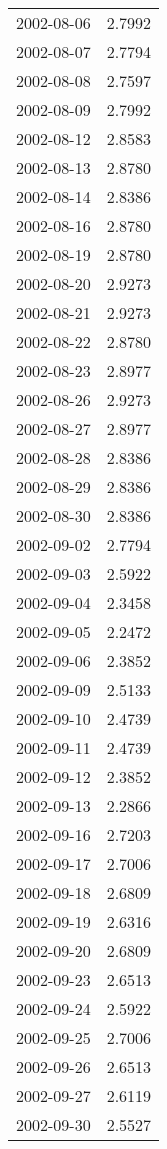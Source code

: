 \begin{tabular}{lr}
2002-08-06 &      2.7992 \\
2002-08-07 &      2.7794 \\
2002-08-08 &      2.7597 \\
2002-08-09 &      2.7992 \\
2002-08-12 &      2.8583 \\
2002-08-13 &      2.8780 \\
2002-08-14 &      2.8386 \\
2002-08-16 &      2.8780 \\
2002-08-19 &      2.8780 \\
2002-08-20 &      2.9273 \\
2002-08-21 &      2.9273 \\
2002-08-22 &      2.8780 \\
2002-08-23 &      2.8977 \\
2002-08-26 &      2.9273 \\
2002-08-27 &      2.8977 \\
2002-08-28 &      2.8386 \\
2002-08-29 &      2.8386 \\
2002-08-30 &      2.8386 \\
2002-09-02 &      2.7794 \\
2002-09-03 &      2.5922 \\
2002-09-04 &      2.3458 \\
2002-09-05 &      2.2472 \\
2002-09-06 &      2.3852 \\
2002-09-09 &      2.5133 \\
2002-09-10 &      2.4739 \\
2002-09-11 &      2.4739 \\
2002-09-12 &      2.3852 \\
2002-09-13 &      2.2866 \\
2002-09-16 &      2.7203 \\
2002-09-17 &      2.7006 \\
2002-09-18 &      2.6809 \\
2002-09-19 &      2.6316 \\
2002-09-20 &      2.6809 \\
2002-09-23 &      2.6513 \\
2002-09-24 &      2.5922 \\
2002-09-25 &      2.7006 \\
2002-09-26 &      2.6513 \\
2002-09-27 &      2.6119 \\
2002-09-30 &      2.5527 \\

\end{tabular}
